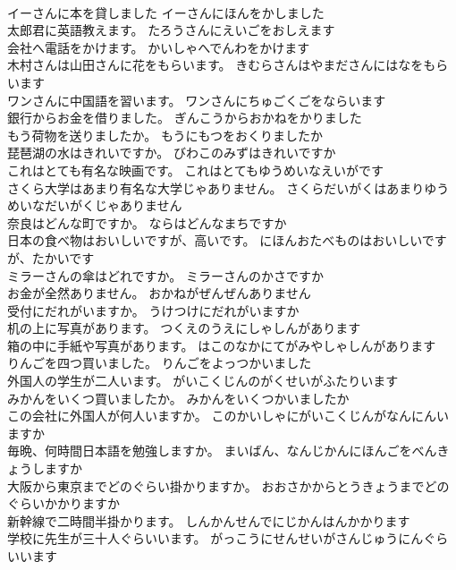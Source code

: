 \documentclass[8pt]{extreport}
\begin{document}
\begin{CJK}{UTF8}{min}
\\	イーさんに本を貸しました	イーさんにほんをかしました 
\\	太郎君に英語教えます。	たろうさんにえいごをおしえます 
\\	会社へ電話をかけます。	かいしゃへでんわをかけます 
\\	木村さんは山田さんに花をもらいます。	きむらさんはやまださんにはなをもらいます 
\\	ワンさんに中国語を習います。	ワンさんにちゅごくごをならいます 
\\	銀行からお金を借りました。	ぎんこうからおかねをかりました 
\\	もう荷物を送りましたか。	もうにもつをおくりましたか 
\\	琵琶湖の水はきれいですか。	びわこのみずはきれいですか 
\\	これはとても有名な映画です。	これはとてもゆうめいなえいがです 
\\	さくら大学はあまり有名な大学じゃありません。	さくらだいがくはあまりゆうめいなだいがくじゃありません 
\\	奈良はどんな町ですか。	ならはどんなまちですか 
\\	日本の食べ物はおいしいですが、高いです。	にほんおたべものはおいしいですが、たかいです 
\\	ミラーさんの傘はどれですか。	ミラーさんのかさですか 
\\	お金が全然ありません。	おかねがぜんぜんありません 
\\	受付にだれがいますか。	うけつけにだれがいますか 
\\	机の上に写真があります。	つくえのうえにしゃしんがあります 
\\	箱の中に手紙や写真があります。	はこのなかにてがみやしゃしんがあります 
\\	りんごを四つ買いました。	りんごをよっつかいました 
\\	外国人の学生が二人います。	がいこくじんのがくせいがふたりいます 
\\	みかんをいくつ買いましたか。	みかんをいくつかいましたか 
\\	この会社に外国人が何人いますか。	このかいしゃにがいこくじんがなんにんいますか 
\\	毎晩、何時間日本語を勉強しますか。	まいばん、なんじかんにほんごをべんきょうしますか 
\\	大阪から東京までどのぐらい掛かりますか。	おおさかからとうきょうまでどのぐらいかかりますか 
\\	新幹線で二時間半掛かります。	しんかんせんでにじかんはんかかります 
\\	学校に先生が三十人ぐらいいます。	がっこうにせんせいがさんじゅうにんぐらいいます 

\end{CJK}
\end{document}
